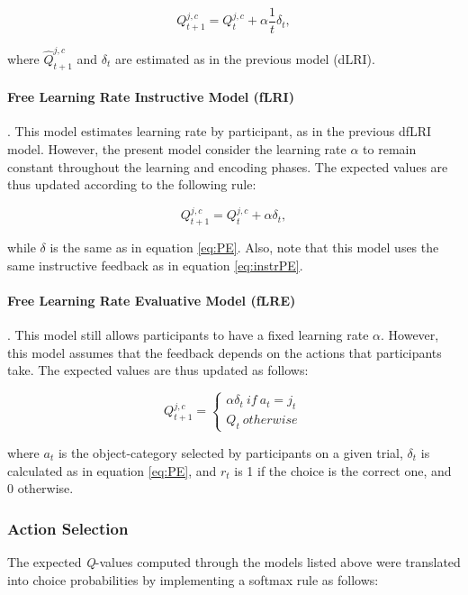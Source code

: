 \documentclass[a4paper,12pt]{article}
\begin{document}
\begin{equation}
{Q}_{t+1}^{j,c} = {Q}_{t}^{j,c}  + {\alpha}  \dfrac{1}{t} \delta_{t},
\label{eq:fLRI}
\end{equation}

\noindent
where $\hat{Q}_{t+1}^{j,c}$ and $\delta_t$ are estimated as in the previous model (dLRI). 

\paragraph{Free Learning Rate Instructive Model (fLRI)}. This model estimates learning rate by participant, as in the previous dfLRI model. However, the present model consider the learning rate $\alpha$ to remain constant throughout the learning and encoding phases. The expected values are thus updated according to the following rule: 

\begin{equation}
{Q}_{t+1}^{j,c} = {Q}_{t}^{j,c}  + {\alpha} \delta_{t},
\label{eq:fLRI}
\end{equation}

\noindent
while $\delta$ is the same as in equation \ref{eq:PE}. Also, note that this model uses the same instructive feedback as in equation \ref{eq:instrPE}.

\paragraph{Free Learning Rate Evaluative Model (fLRE)}. This model still allows participants to have a fixed learning rate $\alpha$. However, this model assumes that the feedback depends on the actions that participants take. The expected values are thus updated as follows:


\begin{equation}
{Q}_{t+1}^{j,c} = \begin{cases}
{\alpha} \delta_{t}\ if  \ a_t = j_t \  \\ 
{Q}_{t} \ otherwise
\end{cases}
\end{equation}

\noindent
where $a_t$ is the object-category selected by participants on a given trial, $\delta_{t}$ is calculated as in equation \ref{eq:PE}, and $r_t$ is 1 if the choice is the correct one, and 0 otherwise. 

\subsubsection{Action Selection} The expected \textit{Q}-values computed through the models listed above were translated into choice probabilities by implementing a softmax rule as follows: 
\end{document}
